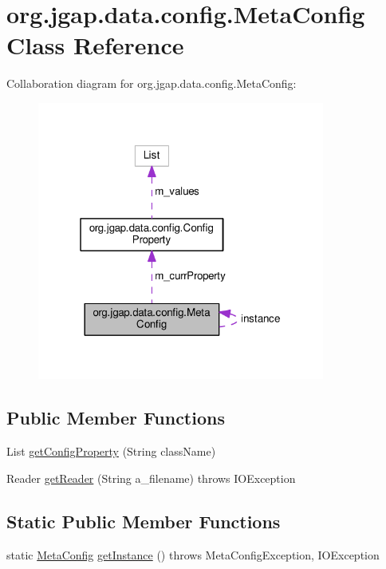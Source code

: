 \hypertarget{classorg_1_1jgap_1_1data_1_1config_1_1_meta_config}{\section{org.\-jgap.\-data.\-config.\-Meta\-Config Class Reference}
\label{classorg_1_1jgap_1_1data_1_1config_1_1_meta_config}
}


Collaboration diagram for org.\-jgap.\-data.\-config.\-Meta\-Config\-:
\nopagebreak
\begin{figure}[H]
\begin{center}
\leavevmode
\includegraphics[width=268pt]{classorg_1_1jgap_1_1data_1_1config_1_1_meta_config__coll__graph}
\end{center}
\end{figure}
\subsection*{Public Member Functions}
\begin{DoxyCompactItemize}
\item 
List \hyperlink{classorg_1_1jgap_1_1data_1_1config_1_1_meta_config_a105fea4eb5a2a82efa187dd1b5f63180}{get\-Config\-Property} (String class\-Name)
\item 
Reader \hyperlink{classorg_1_1jgap_1_1data_1_1config_1_1_meta_config_aa58d256be4e5ea2ff181c6cfa5ce2dea}{get\-Reader} (String a\-\_\-filename)  throws I\-O\-Exception 
\end{DoxyCompactItemize}
\subsection*{Static Public Member Functions}
\begin{DoxyCompactItemize}
\item 
static \hyperlink{classorg_1_1jgap_1_1data_1_1config_1_1_meta_config}{Meta\-Config} \hyperlink{classorg_1_1jgap_1_1data_1_1config_1_1_meta_config_a5fed9a44a12269fad5374560d90aef77}{get\-Instance} ()  throws Meta\-Config\-Exception, I\-O\-Exception 
\end{DoxyCompactItemize}
